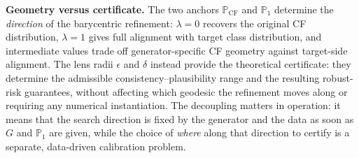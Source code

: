 \color{black}




\textbf{Geometry versus certificate.}
The two anchors $\mathbb{P}_{\mathrm{CF}}$ and $\mathbb{P}_1$ determine the \emph{direction} of the barycentric refinement: $\lambda=0$ recovers the original CF distribution, $\lambda=1$ gives full alignment with target class distribution, and intermediate values trade off generator-specific CF geometry against target-side alignment.
The lens radii $\epsilon$ and $\delta$ instead provide the theoretical certificate: they determine the admissible \textcolor{frappe_red}{consistency}--plausibility range and the resulting robust-risk guarantees, without affecting which geodesic the refinement moves along or requiring any numerical instantiation. 
The decoupling matters in operation: it means that the search direction is fixed by the generator and the data as soon as $G$ and $\mathbb{P}_1$ are given, while the choice of \emph{where} along that direction to certify is a separate, data-driven calibration problem.


